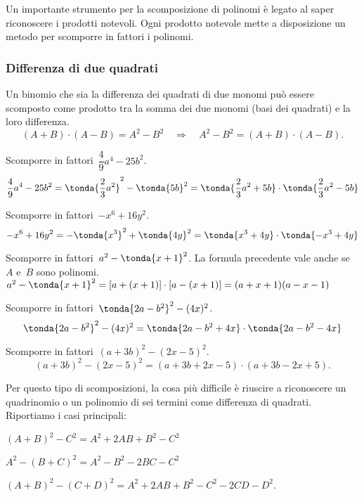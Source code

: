 Un importante strumento per la scomposizione di polinomi è legato al saper 
riconoscere i prodotti notevoli.
Ogni prodotto notevole mette a disposizione un metodo per scomporre in 
fattori i polinomi.

\subsubsection{Differenza di due quadrati}
\label{subsubsec:divpol_difquad}

Un binomio che sia la differenza dei quadrati di due monomi può essere 
scomposto come prodotto tra la somma dei due monomi (basi dei quadrati) e 
la loro differenza.
\begin{equation*}
(A+B)\cdot (A-B)=
A^{2}-B^{2}\quad \Rightarrow \quad A^{2}-B^{2}=(A+B)\cdot (A-B).
\end{equation*}

 \begin{esempio}
Scomporre in fattori~\(\dfrac{4}{9}a^{4}-25b^{2}\).
\[\dfrac{4}{9}a^{4}-25b^{2}=
  \tonda{\dfrac{2}{3}a^{2}}^{2}-\tonda{5b}^{2}=
  \tonda{\dfrac{2}{3}a^{2}+5b}\cdot \tonda{\dfrac{2}{3}a^{{2}}-5b}\]
 \end{esempio}

 \begin{esempio}
Scomporre in fattori~\(-x^6+16y^{2}\).
\[-x^6+16y^{2}=-\tonda{x^3}^{2}+\tonda{4y}^{2}=
  \tonda{x^3+4y}\cdot \tonda{-x^3+4y}\]
 \end{esempio}

 \begin{esempio}
Scomporre in fattori~\(a^{2}-\tonda{x+1}^{2}\).
La formula precedente vale anche se~\(A\) e~\(B\) sono polinomi. 
\(a^{2}-\tonda{x+1}^{2}=
 \left[a+(x+1)\right]\cdot \left[a-(x+1)\right]=(a+x+1)(a-x-1)\)
\end{esempio}

 \begin{esempio}
Scomporre in fattori~\(\tonda{2a-b^{2}}^{2}-(4x)^{2}\).
\[\tonda{2a-b^{2}}^{2}-(4x)^{2}=
\tonda{2a-b^{2}+4x}\cdot \tonda{2a-b^{2}-4x}\]
 \end{esempio}

 \begin{esempio}
Scomporre in fattori~\((a+3b)^{2}-(2x-5)^{2}\).
\[(a+3b)^{2}-(2x-5)^{2}=(a+3b+2x-5)\cdot (a+3b-2x+5).\]
 \end{esempio}

Per questo tipo di scomposizioni, la cosa più difficile è riuscire a 
riconoscere un quadrinomio o un polinomio di sei termini come differenza 
di quadrati. Riportiamo i casi principali:
\begin{itemize*}
 \item \((A+B)^{2}-C^{2}=A^{{2}}+2AB+B^{2}-C^{2}\)
 \item \(A^{2}-(B+C)^{2}=A^{2}-B^{2}-2BC-C^{2}\)
 \item \((A+B)^{2}-(C+D)^{2}=A^{2}+2AB+B^{2}-C^{2}-2CD-D^{2}\).
\end{itemize*}

